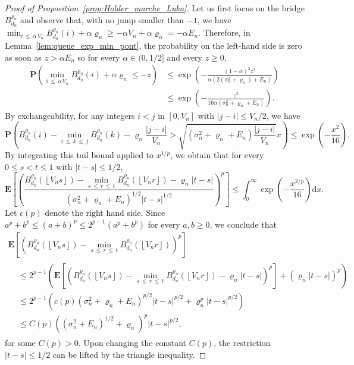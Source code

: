 \documentclass[10pt]{amsart}
\theoremstyle{definition}\newtheorem{defi}[theo]{Definition}\newtheorem{rema}[theo]{Remark}\newtheorem{exam}[theo]{Example}\newtheorem{exem}[theo]{Example}\newtheorem{nota}[theo]{Notation}
\newcommand{\ensembles}[1]{\mathbf{#1}}
\renewcommand{\P}{\ensembles{P}}
\newcommand{\E}{\ensembles{E}}
\renewcommand{\Pr}[1]{\P\left(#1\right)}
\newcommand{\Es}[1]{\E\left[#1\right]}
\newcommand{\1}{\ensembles{1}}
\renewcommand{\le}{\leqslant}
\renewcommand{\ge}{\geqslant}
\renewcommand{\d}{\mathrm{d}}
\newcommand{\Bfn}{B_{d_n}^{\varrho_n}}
\newcommand{\edges}{E}
\newcommand{\vertices}{V}
\providecommand{\?}{}
\begin{document}
\begin{proof}[Proof of Proposition~\ref{prop:Holder_marche_Luka}]
Let us first focus on the bridge $\Bfn$ and observe that, with no jump smaller than $-1$, we have $\min_{i \,\le\,\alpha\,\vertices_n} \Bfn(i) + \alpha \varrho_n \ge - \alpha \vertices_n + \alpha \varrho_n = - \alpha \edges_n$. Therefore, in Lemma~\ref{lem:queue_exp_min_pont}, the probability on the left-hand side is zero as soon as $z > \alpha \edges_n$ so for every $\alpha \in (0,1/2]$ and every $z \ge 0$,
\begin{align*}
\Pr{\min_{i\,\le\,\alpha\,\vertices_n} \Bfn(i) + \alpha \varrho_n \le - z} &\le \exp\left(- \frac{(1 - \alpha)^3 z^2}{\alpha \left(2 \left(\sigma_n^2+\varrho_n\right) + \edges_n\right)}\right)
\\
&\le \exp\left(- \frac{z^2}{16 \alpha \left(\sigma_n^2+\varrho_n + \edges_n\right)}\right).
\end{align*}
By exchangeability, for any integers $i < j$ in $[0, \vertices_n]$ with $|j-i| \le \vertices_n/2$, we have
\[
\P\left(\Bfn(i) - \min_{i\,\le\,k\,\le\,j} \Bfn(k) - \varrho_n \frac{|j-i|}{\vertices_n} > \sqrt{\left(\sigma_n^2+\varrho_n + \edges_n\right) \frac{|j-i|}{\vertices_n}} x\right)
\le \exp\left(- \frac{x^2}{16}\right).
\]
By integrating this tail bound applied to $x^{1/p}$, we obtain that for every $0 \le s < t \le 1$ with $|t-s| \le 1/2$,
\[
\Es{\left(\frac{\Bfn\left(\left\lfloor\vertices_ns\right\rfloor\right) - \min\limits_{s\,\le\,r\,\le\,t} \Bfn\left(\left\lfloor\vertices_nr\right\rfloor\right) - \varrho_n |t-s|}{\left(\sigma_n^2+\varrho_n + \edges_n\right)^{1/2} |t-s|^{1/2}}\right)^p}
\le \int_0^\infty \exp\left(- \frac{x^{2/p}}{16}\right) \d x.
\]
Let $c(p)$ denote the right hand side. Since $a^p + b^p \le (a+b)^p \le 2^{p-1} (a^p + b^p)$ for every $a,b \ge 0$, we conclude that
\begin{multline*}
\Es{\left(\Bfn\left(\left\lfloor\vertices_ns\right\rfloor\right) - \min_{s\,\le\,r\,\le\,t} \Bfn\left(\left\lfloor\vertices_nr\right\rfloor\right)\right)^p}
\\
\begin{aligned}
&\le 2^{p-1} \left(\Es{\left(\Bfn\left(\left\lfloor\vertices_ns\right\rfloor\right) - \min_{s\,\le\,r\,\le\, t} \Bfn\left(\left\lfloor\vertices_nr\right\rfloor\right) - \varrho_n |t-s|\right)^p} + \left(\varrho_n |t-s|\right)^p\right)
\\
&\le 2^{p-1} \left(c(p) \left(\sigma_n^2+\varrho_n + \edges_n\right)^{p/2} |t-s|^{p/2} + \varrho_n^p |t-s|^{p/2}\right)
\\
&\le C(p) \left(\left(\sigma_n^{2}+\edges_{n}\right)^{1/2} + \varrho_n\right)^p |t-s|^{p/2},
\end{aligned}
\end{multline*}
for some $C(p) > 0$. Upon changing the constant $C(p)$, the restriction $|t-s|\le 1/2$ can be lifted by the triangle inequality.


\end{proof}
\end{document}
